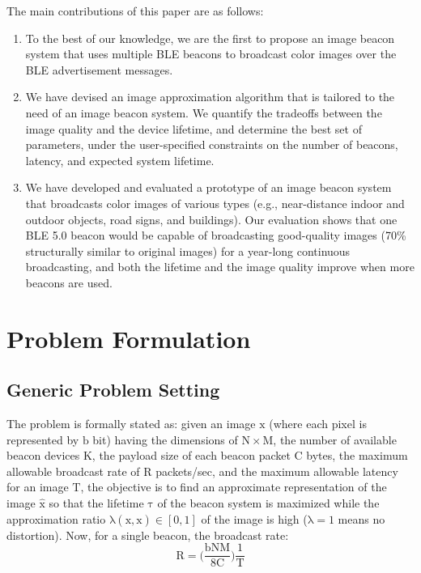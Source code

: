 The main contributions of this paper are as follows:

\begin{enumerate}%
	\item To the best of our knowledge, we are the first to propose an image beacon system that uses multiple BLE beacons to broadcast color images over the BLE advertisement messages.
	\item We have devised an image approximation algorithm that is tailored to the need of an image beacon system. We quantify the tradeoffs between the image quality and the device lifetime, and determine the best set of parameters, under the user-specified constraints on the number of beacons, latency, and expected system lifetime.
  \item We have developed and evaluated a prototype of an image beacon system that broadcasts color images of various types (e.g., near-distance indoor and outdoor objects, road signs, and buildings). Our evaluation shows that one BLE 5.0 beacon would be capable of broadcasting good-quality images (70\% structurally similar to original images) for a year-long continuous broadcasting, and both the lifetime and the image quality improve when more beacons are used.
\end{enumerate}

\section{Problem Formulation}
\label{sec:problem}

\subsection{Generic Problem Setting}

The problem is formally stated as: given an image $\mathrm{x}$ (where each pixel is represented by $\mathrm{b}$ bit) having the dimensions of $\mathrm{N \times M}$, the number of available beacon devices $\mathrm{K}$, the payload size of each beacon packet $\mathrm{C}$ bytes, the maximum allowable broadcast rate of $\mathrm{R}$ packets/sec, and the maximum allowable latency for an image $\mathrm{T}$, the objective is to find an approximate representation of the image $\mathrm{\hat{x}}$ so that the lifetime $\mathrm{\tau}$ of the beacon system is maximized while the approximation ratio $\mathrm{\lambda(x, \hat{x}) \in [0,1]}$ of the image is high ($\mathrm{\lambda = 1}$ means no distortion). Now, for a single beacon, the broadcast rate:
\begin{equation}
	\mathrm{R = \bigg( \frac{bNM}{8C} \bigg) \frac{1}{T}}
	\label{eq:1}
\end{equation}

